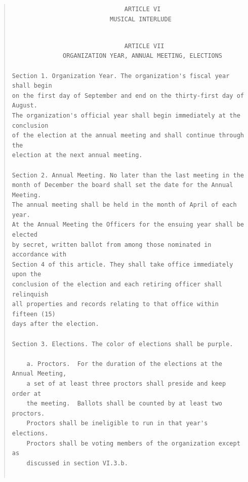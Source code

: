 \documentclass{article}
\begin{document}
\begin{quote}
\begin{verbatim}
                               ARTICLE VI
                           MUSICAL INTERLUDE
\end{verbatim}
\begin{center}
\end{center}

\begin{verbatim}

                               ARTICLE VII
              ORGANIZATION YEAR, ANNUAL MEETING, ELECTIONS

Section 1. Organization Year. The organization's fiscal year shall begin
on the first day of September and end on the thirty-first day of August.
The organization's official year shall begin immediately at the conclusion
of the election at the annual meeting and shall continue through the
election at the next annual meeting.

Section 2. Annual Meeting. No later than the last meeting in the
month of December the board shall set the date for the Annual Meeting.
The annual meeting shall be held in the month of April of each year.
At the Annual Meeting the Officers for the ensuing year shall be elected
by secret, written ballot from among those nominated in accordance with
Section 4 of this article. They shall take office immediately upon the
conclusion of the election and each retiring officer shall relinquish
all properties and records relating to that office within fifteen (15)
days after the election.

Section 3. Elections. The color of elections shall be purple.

    a. Proctors.  For the duration of the elections at the Annual Meeting,
    a set of at least three proctors shall preside and keep order at
    the meeting.  Ballots shall be counted by at least two proctors.
    Proctors shall be ineligible to run in that year's elections.
    Proctors shall be voting members of the organization except as
    discussed in section VI.3.b.


\end{verbatim}
\end{quote}
\end{document}
